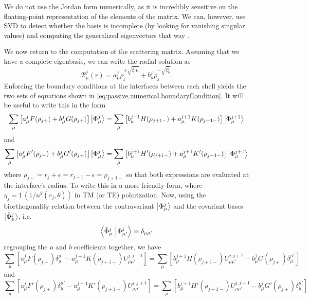 We do not use the Jordan form 
numerically, as it is incredibly sensitive on the floating-point representation
of the elements of the matrix. We can, however, use SVD to detect whether the basis 
is incomplete (by looking for vanishing singular values) and computing the generalized 
eigenvectors that way \cite{PRE2007}. 

We now return to the computation of the scattering matrix. Assuming
that we have a complete eigenbasis, we can write the radial solution
as
	\begin{equation}
		\mathcal{R}^j_\mu(r) = a_\mu^j\rho_j^{+\sqrt{\xi^j\mu}}+b^j_\mu\rho_j^{-\sqrt{\xi^j_\mu}}.
	\end{equation}
Enforcing the boundary conditions at the interfaces between each shell yields the
two sets of equations shown in \eqref{eq:passive.numerical.boundaryCondition}.
It will be useful to write this in the form
 \begin{equation}
   \sum_\mu\left[a_\mu^jF(\rho_{j+})+b_\mu^jG(\rho_{j+})\right]\Ket{\Phi_\mu^j}
    =
   \sum_\mu\left[b_\mu^{j+1}H(\rho_{j+1-})+a_\mu^{j+1}K(\rho_{j+1-})\right]\Ket{\Phi_\mu^{j+1}}
  \end{equation}
and 
  \begin{equation}
    \sum_\mu\left[a_\mu^jF'(\rho_{j+})+b_\mu^jG'(\rho_{j+})\right]\Ket{\Phi_\mu^j}
     =
    \sum_\mu\left[b_\mu^{j+1}H'(\rho_{j+1-})+a_\mu^{j+1}K'(\rho_{j+1-})\right]\Ket{\Phi_\mu^{j+1}}
  \end{equation}
where $\rho_{j+}=r_j+\epsilon=r_{j+1}-\epsilon=\rho_{j+1-}$ so that both expressions are
evaluated at the interface's radius. To write this in a more 
friendly form, where $\eta_j = 1\, (1/n^2(r_j,\theta))$ in TM (or TE) polarization.
Now, using the biorthogonality relation between the contravariant
$\Ket{\Phi^j_\mu}$ and the covariant bases $\Ket{\tilde{\Phi}^j_\mu}$, i.e.
	\begin{equation}
		\Braket{\tilde{\Phi}^j_\mu|\Phi^j_{\mu'}} = \delta_{\mu\mu'}
	\end{equation}
regrouping the $a$ and $b$ coefficients together, we have
  \begin{equation}
   \sum_\mu\left[a_\mu^jF(\rho_{j+})\delta_\mu^{\mu'}-a_\mu^{j+1}K(\rho_{j+1-})U_{\mu\mu'}^{j,j+1}\right]
    =
   \sum_\mu\left[b_\mu^{j+1}H(\rho_{j+1-})U_{\mu\mu'}^{j,j+1}-b_\mu^jG(\rho_{j+})\delta_\mu^{\mu'}\right]
  \end{equation}
and
  \begin{equation}
   \sum_\mu\left[a_\mu^jF'(\rho_{j+})\delta_\mu^{\mu'}-a_\mu^{j+1}K'(\rho_{j+1-})U_{\mu\mu'}^{j,j+1}\right]
    =
   \sum_\mu\left[b_\mu^{j+1}H'(\rho_{j+1-})U_{\mu\mu'}^{j,j+1}-b_\mu^jG'(\rho_{j+})\delta_\mu^{\mu'}\right]
  \end{equation}
